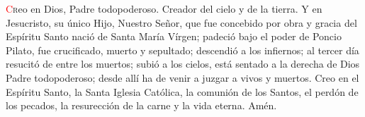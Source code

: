 \lettrine[lines=2]{\textcolor{red}{C}}reo en Dios, Padre todopoderoso. Creador del cielo y de la tierra. Y en Jesucristo, su único Hijo, Nuestro Señor,
que fue concebido por obra y gracia del Espíritu Santo nació de Santa María Vírgen; padeció bajo el poder de Poncio Pilato,
fue crucificado, muerto y sepultado; descendió a los infiernos; al tercer día resucitó de entre los muertos; subió a los cielos,
está sentado a la derecha de Dios Padre todopoderoso; desde allí ha de venir a juzgar a vivos y muertos.
Creo en el Espíritu Santo, la Santa Iglesia Católica, la comunión de los Santos, el perdón de los pecados,
la resurección de la carne y la vida eterna. Amén.